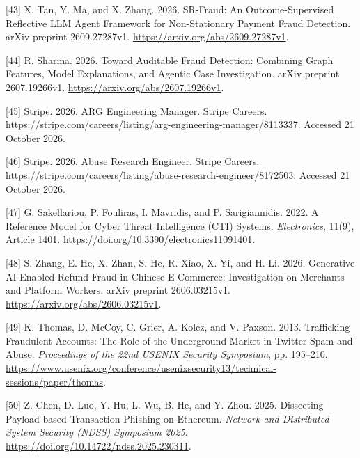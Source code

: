 \documentclass[
  11pt,
]{article}
\newlength{\cslhangindent}
\newlength{\cslentryspacingunit} %
\newenvironment{CSLReferences}[2] %
 {%
  \setlength{\parindent}{0pt}
  \ifodd #1
  \let\oldpar\par
  \def\par{\hangindent=\cslhangindent\oldpar}
  \fi
  \setlength{\parskip}{#2\cslentryspacingunit}
 }%
 {}
\begin{document}
\begin{CSLReferences}{1}{1}
\leavevmode{}%
{[}43{]} X. Tan, Y. Ma, and X. Zhang. 2026. SR-Fraud: An
Outcome-Supervised Reflective LLM Agent Framework for Non-Stationary
Payment Fraud Detection. arXiv preprint 2609.27287v1.
\url{https://arxiv.org/abs/2609.27287v1}.

\leavevmode{}%
{[}44{]} R. Sharma. 2026. Toward Auditable Fraud Detection: Combining
Graph Features, Model Explanations, and Agentic Case Investigation.
arXiv preprint 2607.19266v1. \url{https://arxiv.org/abs/2607.19266v1}.

\leavevmode{}%
{[}45{]} Stripe. 2026. ARG Engineering Manager. Stripe Careers.
\url{https://stripe.com/careers/listing/arg-engineering-manager/8113337}.
Accessed 21 October 2026.

\leavevmode{}%
{[}46{]} Stripe. 2026. Abuse Research Engineer. Stripe Careers.
\url{https://stripe.com/careers/listing/abuse-research-engineer/8172503}.
Accessed 21 October 2026.

\leavevmode{}%
{[}47{]} G. Sakellariou, P. Fouliras, I. Mavridis, and P. Sarigiannidis.
2022. A Reference Model for Cyber Threat Intelligence (CTI) Systems.
\emph{Electronics}, 11(9), Article 1401.
\url{https://doi.org/10.3390/electronics11091401}.

\leavevmode{}%
{[}48{]} S. Zhang, E. He, X. Zhan, S. He, R. Xiao, X. Yi, and H. Li.
2026. Generative AI-Enabled Refund Fraud in Chinese E-Commerce:
Investigation on Merchants and Platform Workers. arXiv preprint
2606.03215v1. \url{https://arxiv.org/abs/2606.03215v1}.

\leavevmode{}%
{[}49{]} K. Thomas, D. McCoy, C. Grier, A. Kolcz, and V. Paxson. 2013.
Trafficking Fraudulent Accounts: The Role of the Underground Market in
Twitter Spam and Abuse. \emph{Proceedings of the 22nd USENIX Security
Symposium}, pp. 195--210.
\url{https://www.usenix.org/conference/usenixsecurity13/technical-sessions/paper/thomas}.

\leavevmode{}%
{[}50{]} Z. Chen, D. Luo, Y. Hu, L. Wu, B. He, and Y. Zhou. 2025.
Dissecting Payload-based Transaction Phishing on Ethereum. \emph{Network
and Distributed System Security (NDSS) Symposium 2025}.
\url{https://doi.org/10.14722/ndss.2025.230311}.


\end{CSLReferences}
\end{document}
